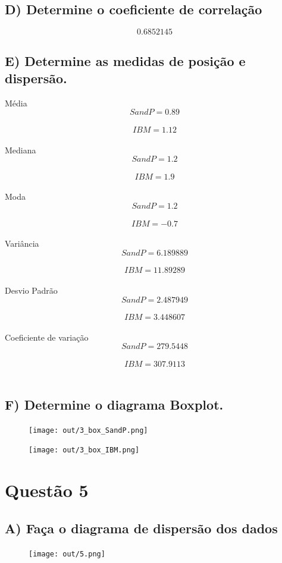 \documentclass[17pt]{extarticle}
\begin{document}
\subsection{D) Determine o coeficiente de correlação}
\[ 0.6852145 \]

\subsection{E) Determine as medidas de posição e dispersão.}
Média \\
\[ SandP = 0.89 \] \\
\[ IBM = 1.12 \] \\
Mediana \\
\[ SandP = 1.2 \] \\
\[ IBM = 1.9 \] \\
Moda \\
\[ SandP = 1.2\] \\
\[ IBM = -0.7 \] \\
Variância \\ 
\[ SandP = 6.189889 \] \\
\[ IBM = 11.89289 \] \\
Desvio Padrão \\ 
\[ SandP = 2.487949 \] \\
\[ IBM = 3.448607 \] \\
Coeficiente de variação \\
\[ SandP = 279.5448 \] \\
\[ IBM = 307.9113 \] \\

\subsection{F) Determine o diagrama Boxplot.}
\begin{figure}[H]
    \centering
    \texttt{[image: out/3\_box\_SandP.png]}
    \label{fig:my_label}
\end{figure}
\begin{figure}[H]
    \centering
    \texttt{[image: out/3\_box\_IBM.png]}
    \label{fig:my_label}
\end{figure}

\section{Questão 5}
\subsection{A) Faça o diagrama de dispersão dos dados}
\begin{figure}[H]
    \centering
    \texttt{[image: out/5.png]}
    \label{fig:my_label}
\end{figure}
\end{document}
